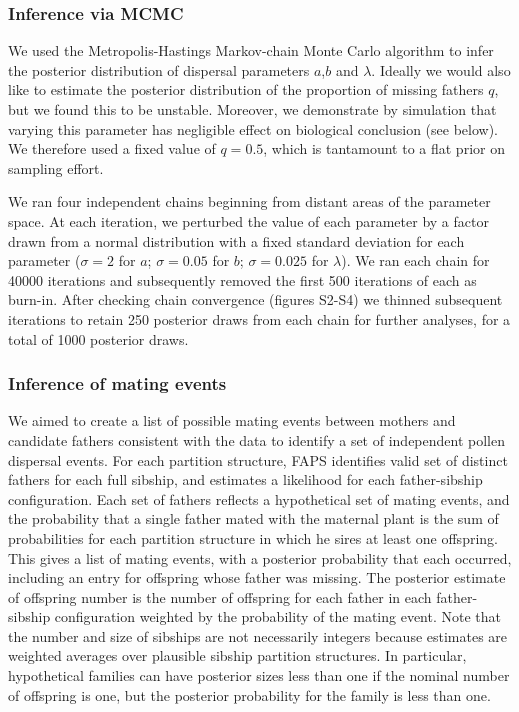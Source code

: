 \documentclass[10pt, a4paper, twocolumn]{article} %
\begin{document}
\subsubsection{Inference via MCMC}

We used the Metropolis-Hastings Markov-chain Monte Carlo algorithm to infer the posterior distribution of dispersal parameters $a$,$b$ and $\lambda$.
Ideally we would also like to estimate the posterior distribution of the proportion of missing fathers $q$, but we found this to be unstable.
Moreover, we demonstrate by simulation that varying this parameter has negligible effect on biological conclusion (see below).
We therefore used a fixed value of $q=0.5$, which is tantamount to a flat prior on sampling effort. 

We ran four independent chains beginning from distant areas of the parameter space.
At each iteration, we perturbed the value of each parameter by a factor drawn from a normal distribution with a fixed standard deviation for each parameter ($\sigma= 2$ for $a$; $\sigma= 0.05$ for $b$; $\sigma= 0.025$ for $\lambda$).
We ran each chain for 40000 iterations and subsequently removed the first 500 iterations of each as burn-in.
After checking chain convergence (figures S2-S4) we thinned subsequent iterations to retain 250 posterior draws from each chain for further analyses, for a total of 1000 posterior draws.

\subsubsection{Inference of mating events}

We aimed to create a list of possible mating events between mothers and candidate fathers consistent with the data to identify a set of independent pollen dispersal events.
For each partition structure, FAPS identifies valid set of distinct fathers for each full sibship, and estimates a likelihood for each father-sibship configuration.
Each set of fathers reflects a hypothetical set of mating events, and the probability that a single father mated with the maternal plant is the sum of probabilities for each partition structure in which he sires at least one offspring.
This gives a list of mating events, with a posterior probability that each occurred, including an entry for offspring whose father was missing.
The posterior estimate of offspring number is the number of offspring for each father in each father-sibship configuration weighted by the probability of the mating event.
Note that the number and size of sibships are not necessarily integers because estimates are weighted averages over plausible sibship partition structures.
In particular, hypothetical families can have posterior sizes less than one if the nominal number of offspring is one, but the posterior probability for the family is less than one.
\end{document}

